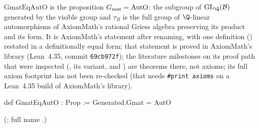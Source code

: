 \begin{definition}\label{ch22:def:GmatEqAutO}
$\mathrm{GmatEqAutO}$ is the proposition $G_{\mathrm{mat}}=\mathrm{AutO}$: the subgroup of $\mathrm{GL}_\Q(\chtwentytwoB)$
generated by the visible group and $\tau_B$ is the full group of $\Q$-linear automorphisms of AxiomMath's rational Griess
algebra preserving its product and its form.  It is AxiomMath's statement  after renaming, with one
definition () restated in a definitionally equal form; that statement is proved in AxiomMath's library (Lean~4.35, commit \texttt{69cb972f}); the literature milestones on its proof path that were
inspected (, its  variant, and
) are theorems there, not axioms; its full axiom footprint has not been
re-checked (that needs \texttt{\#print axioms} on a Lean~4.35 build of AxiomMath's library).
\end{definition}
\begin{leancode}
def GmatEqAutO : Prop :=
  Generated.Gmat = AutO
\end{leancode}
(; full name .)

